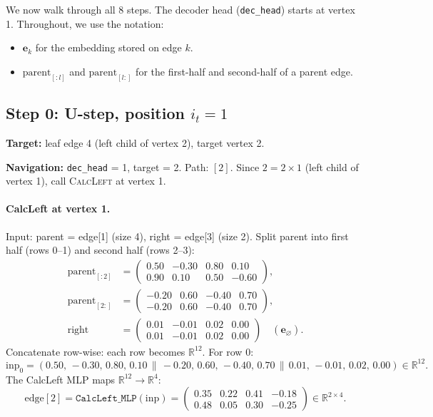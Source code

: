 \documentclass[11pt,a4paper]{article}
\newcommand{\R}{\mathbb{R}}
\newcommand{\concat}{\,\|\,}
\newcommand{\emb}[1]{\mathbf{e}_{#1}}
\newcommand{\noinf}{\mathbf{e}_{\varnothing}}
\newcommand{\calL}{\textsc{CalcLeft}}
\begin{document}
We now walk through all 8 steps.  The decoder head (\texttt{dec\_head}) starts at vertex 1.  Throughout, we use the notation:
\begin{itemize}[nosep]
\item $\emb{k}$ for the embedding stored on edge $k$.
\item $\text{parent}_{[:l]}$ and $\text{parent}_{[l:]}$ for the first-half and second-half of a parent edge.
\end{itemize}

\subsection{Step 0: U-step, position $i_t = 1$}

\textbf{Target:} leaf edge 4 (left child of vertex 2), target vertex 2.

\textbf{Navigation:} \texttt{dec\_head} = 1, target = 2.  Path: $[2]$.  Since $2 = 2 \times 1$ (left child of vertex 1), call \calL{} at vertex 1.

\paragraph{CalcLeft at vertex 1.}
Input: parent = edge[1] (size 4), right = edge[3] (size 2).  Split parent into first half (rows 0--1) and second half (rows 2--3):
\begin{align*}
\text{parent}_{[:2]} &= \begin{pmatrix} 0.50 & -0.30 & 0.80 & 0.10 \\ 0.90 & 0.10 & 0.50 & -0.60 \end{pmatrix}, \\
\text{parent}_{[2:]} &= \begin{pmatrix} -0.20 & 0.60 & -0.40 & 0.70 \\ -0.20 & 0.60 & -0.40 & 0.70 \end{pmatrix}, \\
\text{right} &= \begin{pmatrix} 0.01 & -0.01 & 0.02 & 0.00 \\ 0.01 & -0.01 & 0.02 & 0.00 \end{pmatrix} \quad (\noinf).
\end{align*}
Concatenate row-wise: each row becomes $\R^{12}$.  For row 0:
\[
\text{inp}_0 = (0.50,\, {-}0.30,\, 0.80,\, 0.10 \concat {-}0.20,\, 0.60,\, {-}0.40,\, 0.70 \concat 0.01,\, {-}0.01,\, 0.02,\, 0.00) \in \R^{12}.
\]
The CalcLeft MLP maps $\R^{12} \to \R^4$:
\[
\text{edge}[2] = \texttt{CalcLeft\_MLP}(\text{inp}) = \begin{pmatrix}
0.35 & 0.22 & 0.41 & -0.18 \\
0.48 & 0.05 & 0.30 & -0.25
\end{pmatrix} \in \R^{2 \times 4}.
\]
\end{document}
